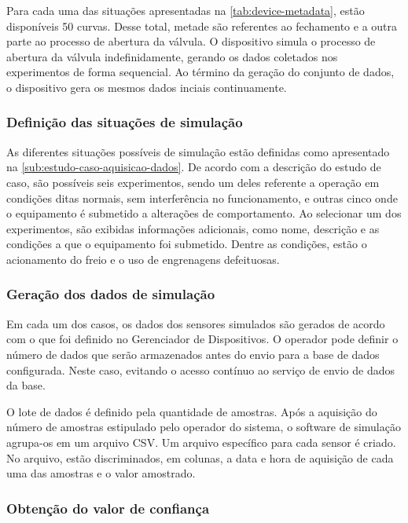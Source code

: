 Para cada uma das situações apresentadas na \cref{tab:device-metadata}, estão disponíveis \num{50}
curvas. Desse total, metade são referentes ao fechamento e a outra parte ao processo de abertura da
válvula. O dispositivo simula o processo de abertura da válvula indefinidamente, gerando os dados
coletados nos experimentos de forma sequencial. Ao término da geração do conjunto de dados, o
dispositivo gera os mesmos dados inciais continuamente.


\subsubsection{Definição das situações de simulação}

As diferentes situações possíveis de simulação estão definidas como apresentado na
\cref{sub:estudo-caso-aquisicao-dados}. De acordo com a descrição do estudo de caso, são possíveis
seis experimentos, sendo um deles referente a operação em condições ditas normais, sem interferência
no funcionamento, e outras cinco onde o equipamento é submetido a alterações de comportamento. Ao
selecionar um dos experimentos, são exibidas informações adicionais, como nome, descrição e as
condições a que o equipamento foi submetido. Dentre as condições, estão o acionamento do freio e o
uso de engrenagens defeituosas.


\subsubsection{Geração dos dados de simulação}

Em cada um dos casos, os dados dos sensores simulados são gerados de acordo com o que foi definido
no Gerenciador de Dispositivos. O operador pode definir o número de dados que serão armazenados
antes do envio para a base de dados configurada. Neste caso, evitando o acesso contínuo ao serviço
de envio de dados da base.

O lote de dados é definido pela quantidade de amostras. Após a aquisição do número de amostras
estipulado pelo operador do sistema, o software de simulação agrupa-os em um arquivo \gls{CSV}. Um
arquivo específico para cada sensor é criado. No arquivo, estão discriminados, em colunas, a data e
hora de aquisição de cada uma das amostras e o valor amostrado.


\subsubsection{Obtenção do valor de confiança}

